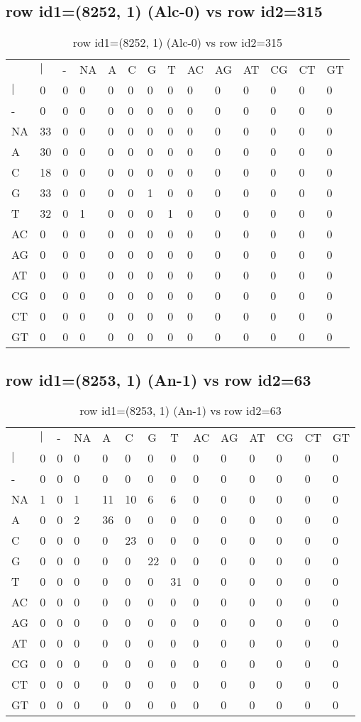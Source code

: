 \subsection{row id1=(8252, 1) (Alc-0) vs row id2=315}
\begin{center}
\begin{longtable}{|l|l|l|l|l|l|l|l|l|l|l|l|l|l|}
\caption{row id1=(8252, 1) (Alc-0) vs row id2=315} \label{table_dm198}\\
\hline
\\
\hline
&$|$&-&NA&A&C&G&T&AC&AG&AT&CG&CT&GT\\
$|$&0&0&0&0&0&0&0&0&0&0&0&0&0\\
-&0&0&0&0&0&0&0&0&0&0&0&0&0\\
NA&33&0&0&0&0&0&0&0&0&0&0&0&0\\
A&30&0&0&0&0&0&0&0&0&0&0&0&0\\
C&18&0&0&0&0&0&0&0&0&0&0&0&0\\
G&33&0&0&0&0&1&0&0&0&0&0&0&0\\
T&32&0&1&0&0&0&1&0&0&0&0&0&0\\
AC&0&0&0&0&0&0&0&0&0&0&0&0&0\\
AG&0&0&0&0&0&0&0&0&0&0&0&0&0\\
AT&0&0&0&0&0&0&0&0&0&0&0&0&0\\
CG&0&0&0&0&0&0&0&0&0&0&0&0&0\\
CT&0&0&0&0&0&0&0&0&0&0&0&0&0\\
GT&0&0&0&0&0&0&0&0&0&0&0&0&0\\
\hline
\end{longtable}
\end{center}

\subsection{row id1=(8253, 1) (An-1) vs row id2=63}
\begin{center}
\begin{longtable}{|l|l|l|l|l|l|l|l|l|l|l|l|l|l|}
\caption{row id1=(8253, 1) (An-1) vs row id2=63} \label{table_dm200}\\
\hline
\\
\hline
&$|$&-&NA&A&C&G&T&AC&AG&AT&CG&CT&GT\\
$|$&0&0&0&0&0&0&0&0&0&0&0&0&0\\
-&0&0&0&0&0&0&0&0&0&0&0&0&0\\
NA&1&0&1&11&10&6&6&0&0&0&0&0&0\\
A&0&0&2&36&0&0&0&0&0&0&0&0&0\\
C&0&0&0&0&23&0&0&0&0&0&0&0&0\\
G&0&0&0&0&0&22&0&0&0&0&0&0&0\\
T&0&0&0&0&0&0&31&0&0&0&0&0&0\\
AC&0&0&0&0&0&0&0&0&0&0&0&0&0\\
AG&0&0&0&0&0&0&0&0&0&0&0&0&0\\
AT&0&0&0&0&0&0&0&0&0&0&0&0&0\\
CG&0&0&0&0&0&0&0&0&0&0&0&0&0\\
CT&0&0&0&0&0&0&0&0&0&0&0&0&0\\
GT&0&0&0&0&0&0&0&0&0&0&0&0&0\\
\hline
\end{longtable}
\end{center}

